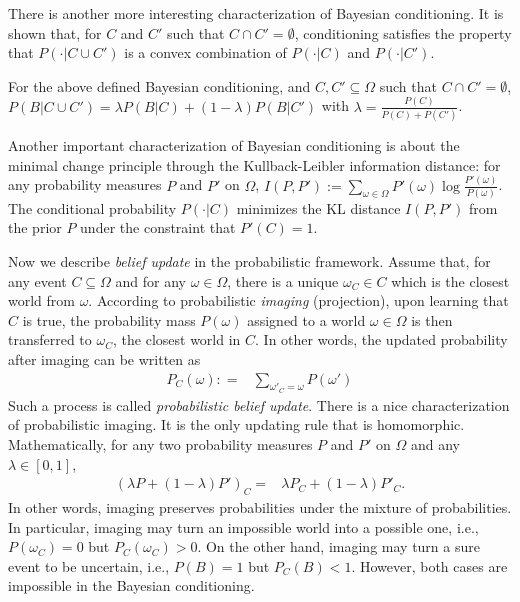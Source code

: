 \documentclass[11pt]{article}
\begin{document}
There is another more interesting characterization of Bayesian conditioning.  It is shown \cite{Gardenfors1988knowledge} that, for $C$ and $C'$ such that $C\cap C' =\emptyset$, conditioning  satisfies the property that $P(\cdot | C\cup C')$ is a convex combination of $P(\cdot | C)$ and $P(\cdot | C')$. 

\begin{proposition} \label{lem:convex-combination} For the above defined Bayesian conditioning, and $C, C'\subseteq \Omega$ such that $C\cap C' =\emptyset$, $P(B| C\cup C')  = \lambda P(B|C) + (1-\lambda) P(B | C')$ with $\lambda = \frac{P(C)}{P(C) + P(C')}$.
\end{proposition}

Another important characterization of Bayesian conditioning is about the minimal change principle through the Kullback-Leibler information distance: for any probability measures $P$ and $P'$ on $\Omega$,
$I(P, P'):=  \sum_{\omega\in \Omega} P'(\omega) \log \frac{P'(\omega)}{P(\omega)}$. 
The conditional probability $P(\cdot | C)$ minimizes the KL distance $I(P,P')$ from the prior $P$ under the constraint that $P'(C)=1$.


Now we describe \emph{belief update} in the probabilistic framework.  Assume that, for any event $C\subseteq \Omega$ and for any $\omega\in \Omega$, there is a unique $\omega_C\in C$ which is the closest world from $\omega$. According to probabilistic \emph{imaging} (projection), upon learning that $C$ is true, the 
probability mass $P(\omega)$ assigned to a world $\omega \in \Omega$ is then transferred to $\omega_C$, the closest world in $C$.  In other words, the updated probability after imaging can be written as 
\begin{align}
 P_C(\omega): = & \sum_{\omega'_C = \omega} P(\omega') \label{eq:imaging}
\end{align}
Such a process is called \emph{probabilistic belief update}. There is a nice characterization of probabilistic imaging. It is the only updating rule that is homomorphic. Mathematically, for any two probability measures $P$ and $P'$ on $\Omega$ and any $\lambda \in [0, 1]$, 
\begin{align}
(\lambda P + (1-\lambda) P')_C = & \lambda P_C + (1-\lambda) P'_C. \label{eq:mixture-preserving}
\end{align}
In other words, imaging preserves probabilities under the mixture of probabilities.  In particular, imaging may turn an impossible world into a possible one, i.e., $P(\omega_C) = 0$ but $P_C(\omega_C) >0$.  On the other hand, imaging may turn a sure event to be uncertain, i.e., $P(B) = 1$ but $P_C(B) < 1$.  However, both cases are impossible in the Bayesian conditioning. 
\end{document}
